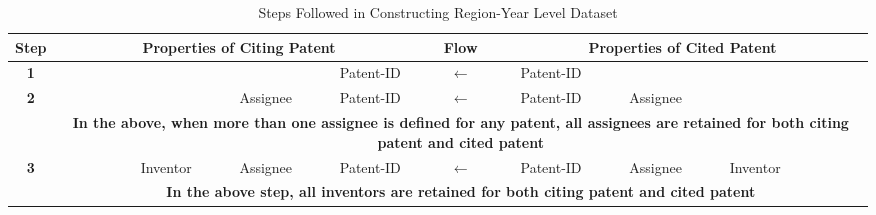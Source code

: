 \begin{sidewaystable}[htbp]\centering
\caption{Steps Followed in Constructing Region-Year Level Dataset}
\small
\begin{tabular}{|c|c|c|c|c|c|c|c|c|c|c|c|c|c|}
\toprule
\textbf{Step} & \multicolumn{6}{c|}{\cellcolor[rgb]{ .988,  .894,  .839}\textbf{Properties of Citing Patent}} & \textbf{Flow} & \multicolumn{6}{c|}{\cellcolor[rgb]{ .741,  .843,  .933}\textbf{Properties of Cited Patent}} \\
\midrule
\textbf{1} & \cellcolor[rgb]{ .988,  .894,  .839} & \cellcolor[rgb]{ .988,  .894,  .839} & \cellcolor[rgb]{ .988,  .894,  .839} & \cellcolor[rgb]{ .988,  .894,  .839} & \cellcolor[rgb]{ .988,  .894,  .839} & \cellcolor[rgb]{ .988,  .894,  .839}Patent-ID & \textbf{$\leftarrow$} & \cellcolor[rgb]{ .741,  .843,  .933}Patent-ID & \cellcolor[rgb]{ .741,  .843,  .933} & \cellcolor[rgb]{ .741,  .843,  .933} & \cellcolor[rgb]{ .741,  .843,  .933} & \cellcolor[rgb]{ .741,  .843,  .933} & \cellcolor[rgb]{ .741,  .843,  .933} \\
\midrule
\textbf{2} & \cellcolor[rgb]{ .988,  .894,  .839} & \cellcolor[rgb]{ .988,  .894,  .839} & \cellcolor[rgb]{ .988,  .894,  .839} & \cellcolor[rgb]{ .988,  .894,  .839} & \cellcolor[rgb]{ .988,  .894,  .839}Assignee & \cellcolor[rgb]{ .988,  .894,  .839}Patent-ID & \textbf{$\leftarrow$} & \cellcolor[rgb]{ .741,  .843,  .933}Patent-ID & \cellcolor[rgb]{ .741,  .843,  .933}Assignee & \cellcolor[rgb]{ .741,  .843,  .933} & \cellcolor[rgb]{ .741,  .843,  .933} & \cellcolor[rgb]{ .741,  .843,  .933} & \cellcolor[rgb]{ .741,  .843,  .933} \\
\midrule
& \multicolumn{13}{c|}{\cellcolor[rgb]{ .886,  .937,  .855}\textbf{In the above, when more than one assignee is defined for any patent, all assignees are retained for both citing patent and cited patent}} \\
\midrule
\textbf{3} & \cellcolor[rgb]{ .988,  .894,  .839} & \cellcolor[rgb]{ .988,  .894,  .839} & \cellcolor[rgb]{ .988,  .894,  .839} & \cellcolor[rgb]{ .988,  .894,  .839}Inventor & \cellcolor[rgb]{ .988,  .894,  .839}Assignee & \cellcolor[rgb]{ .988,  .894,  .839}Patent-ID & \textbf{$\leftarrow$} & \cellcolor[rgb]{ .741,  .843,  .933}Patent-ID & \cellcolor[rgb]{ .741,  .843,  .933}Assignee & \cellcolor[rgb]{ .741,  .843,  .933}Inventor & \cellcolor[rgb]{ .741,  .843,  .933} & \cellcolor[rgb]{ .741,  .843,  .933} & \cellcolor[rgb]{ .741,  .843,  .933} \\
\midrule
& \multicolumn{13}{c|}{\cellcolor[rgb]{ .886,  .937,  .855}\textbf{In the above step, all inventors are retained for both citing patent and cited patent}} \\

\end{tabular}
\end{sidewaystable}
